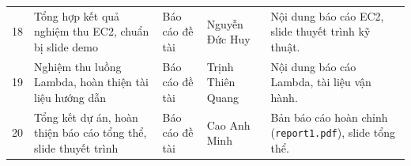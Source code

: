 \documentclass[a4paper,12pt]{article}
\begin{document}
\begin{longtable}{@{}p{0.6cm}>{\raggedright\arraybackslash}p{3.8cm}>{\raggedright\arraybackslash}p{3.2cm}>{\raggedright\arraybackslash}p{2.6cm}>{\raggedright\arraybackslash}p{4.8cm}@{}}
18 & Tổng hợp kết quả nghiệm thu EC2, chuẩn bị slide demo & Báo cáo đề tài & Nguyễn Đức Huy & Nội dung báo cáo EC2, slide thuyết trình kỹ thuật.\\
19 & Nghiệm thu luồng Lambda, hoàn thiện tài liệu hướng dẫn & Báo cáo đề tài & Trịnh Thiên Quang & Nội dung báo cáo Lambda, tài liệu vận hành.\\
20 & Tổng kết dự án, hoàn thiện báo cáo tổng thể, slide thuyết trình & Báo cáo đề tài & Cao Anh Minh & Bản báo cáo hoàn chỉnh (\texttt{report1.pdf}), slide tổng thể.\\
\end{longtable}
\endgroup
\end{document}
